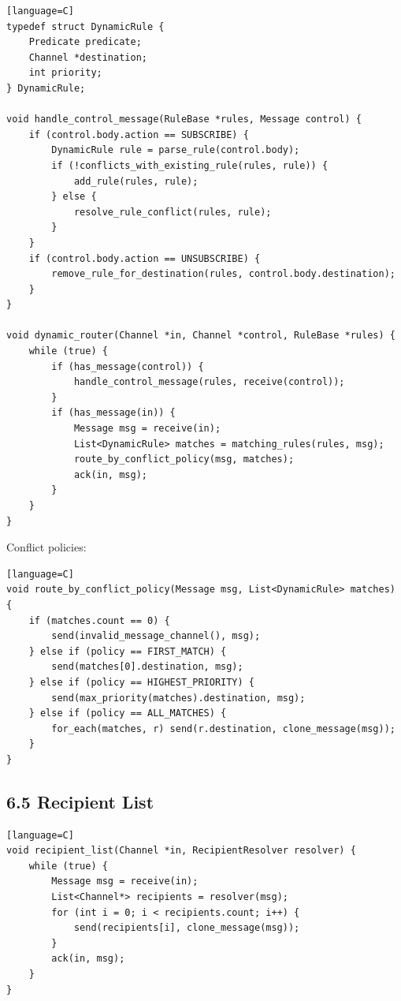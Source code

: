 \documentclass[11pt]{article}
\begin{document}
\begin{verbatim}[language=C]
typedef struct DynamicRule {
    Predicate predicate;
    Channel *destination;
    int priority;
} DynamicRule;

void handle_control_message(RuleBase *rules, Message control) {
    if (control.body.action == SUBSCRIBE) {
        DynamicRule rule = parse_rule(control.body);
        if (!conflicts_with_existing_rule(rules, rule)) {
            add_rule(rules, rule);
        } else {
            resolve_rule_conflict(rules, rule);
        }
    }
    if (control.body.action == UNSUBSCRIBE) {
        remove_rule_for_destination(rules, control.body.destination);
    }
}

void dynamic_router(Channel *in, Channel *control, RuleBase *rules) {
    while (true) {
        if (has_message(control)) {
            handle_control_message(rules, receive(control));
        }
        if (has_message(in)) {
            Message msg = receive(in);
            List<DynamicRule> matches = matching_rules(rules, msg);
            route_by_conflict_policy(msg, matches);
            ack(in, msg);
        }
    }
}
\end{verbatim}

Conflict policies:

\begin{verbatim}[language=C]
void route_by_conflict_policy(Message msg, List<DynamicRule> matches) {
    if (matches.count == 0) {
        send(invalid_message_channel(), msg);
    } else if (policy == FIRST_MATCH) {
        send(matches[0].destination, msg);
    } else if (policy == HIGHEST_PRIORITY) {
        send(max_priority(matches).destination, msg);
    } else if (policy == ALL_MATCHES) {
        for_each(matches, r) send(r.destination, clone_message(msg));
    }
}
\end{verbatim}

\subsection{6.5 Recipient List}\label{recipient-list}

\begin{verbatim}[language=C]
void recipient_list(Channel *in, RecipientResolver resolver) {
    while (true) {
        Message msg = receive(in);
        List<Channel*> recipients = resolver(msg);
        for (int i = 0; i < recipients.count; i++) {
            send(recipients[i], clone_message(msg));
        }
        ack(in, msg);
    }
}
\end{verbatim}
\end{document}
